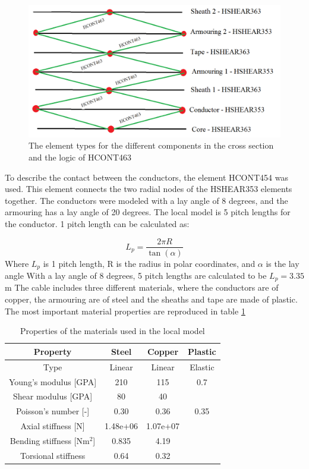 \begin{figure}[H]
\centering
\includegraphics[scale=0.5]{figures/contact}
\caption[$\; \:$ Logic of HCONT463]{The element types for the different components in the cross section and the logic of HCONT463}
 \label{fig:contact}
\end{figure}

\noindent To describe the contact between the conductors, the element HCONT454 was used. This element connects the two radial nodes of the HSHEAR353 elements together.\newline
\newline
The conductors were modeled with a lay angle of 8 degrees, and the armouring has a lay angle of 20 degrees. The local model is 5 pitch lengths for the conductor. 1 pitch length can be calculated as:

 \begin{equation}
   L_p = \frac{2\pi R}{\tan(\alpha)}
\end{equation}
 Where $L_p$ is 1 pitch length, R is the radius in polar coordinates, and $\alpha$ is the lay angle\newline
 \newline
 With a lay angle of 8 degrees, 5 pitch lengths are calculated to be $L_p=3.35$m \newline
\newline
The cable includes three different materials, where the conductors are of copper, the armouring are of steel and the sheaths and tape are made of plastic. The most important material properties are reproduced in table \ref{table:matprop}
\begin{table} [H]
\centering
\begin{tabular}{ |c|c|c|c|}
\hline
Property &Steel & Copper  & Plastic \\
 \hline
 \hline
Type & Linear & Linear & Elastic\\
Young's modulus [GPA] & 210 & 115 & 0.7\\
Shear modulus [GPA]& 80 & 40 &  \\
Poisson's number [-]& 0.30 & 0.36 & 0.35\\
Axial stiffness [N]& 1.48e+06 & 1.07e+07 & \\
Bending stiffness [Nm$^2$] & 0.835 & 4.19 &\\
Torsional stiffness & 0.64 & 0.32&\\
 \hline
\end{tabular}
\caption{Properties of the materials used in the local model}
\label{table:matprop}
\end{table}


